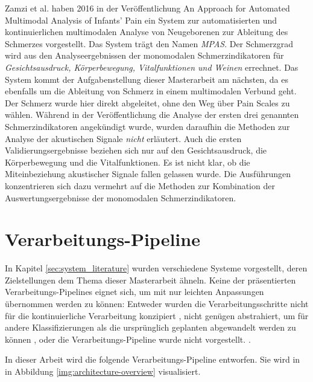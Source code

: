 Zamzi et al.  haben 2016 in der Veröffentlichung \glqq An Approach for Automated Multimodal Analysis of Infants' Pain\grqq{} \cite{zamziMultimodal} ein System zur automatisierten und kontinuierlichen multimodalen Analyse von Neugeborenen zur Ableitung des Schmerzes vorgestellt. Das System trägt den Namen \emph{MPAS}. Der Schmerzgrad wird aus den Analyseergebnissen der monomodalen Schmerzindikatoren für \emph{Gesichtsausdruck, Körperbewegung, Vitalfunktionen und Weinen} errechnet. Das System kommt der Aufgabenstellung dieser Masterarbeit am nächsten, da es ebenfalls um die Ableitung von Schmerz in einem multimodalen Verbund geht. Der Schmerz wurde hier \glqq direkt\grqq{} abgeleitet, ohne den Weg über Pain Scales zu wählen. Während in der Veröffentlichung die Analyse der ersten drei genannten Schmerzindikatoren angekündigt wurde, wurden daraufhin die Methoden zur Analyse der akustischen Signale \emph{nicht} erläutert. Auch die ersten Validierungsergebnisse beziehen sich nur auf den Gesichtsausdruck, die Körperbewegung und die Vitalfunktionen. Es ist nicht klar, ob die Miteinbeziehung akustischer Signale fallen gelassen wurde. Die Ausführungen konzentrieren sich dazu vermehrt auf die Methoden zur Kombination der Auswertungsergebnisse der monomodalen Schmerzindikatoren.

\section{Verarbeitungs-Pipeline}

In Kapitel \ref{sec:system_literature} wurden verschiedene Systeme vorgestellt, deren Zielstellungen dem Thema dieser Masterarbeit ähneln. Keine der präsentierten Verarbeitungs-Pipelines eignet sich, um mit nur leichten Anpassungen übernommen werden zu können: Entweder wurden die Verarbeitungsschritte nicht für die kontinuierliche Verarbeitung konzipiert \cite{class_abdulaziz} \cite{comparisonOfLearning} \cite{cry_thesis}, nicht genügen abstrahiert, um für andere Klassifizierungen als die ursprünglich geplanten abgewandelt werden zu können \cite{cohenCry}, oder die Verarbeitungs-Pipeline wurde nicht vorgestellt. \cite{palEmotion} \cite{zamziMultimodal}.

In dieser Arbeit wird die folgende Verarbeitungs-Pipeline entworfen. Sie wird in in Abbildung \ref{img:architecture-overview} visualisiert. 

